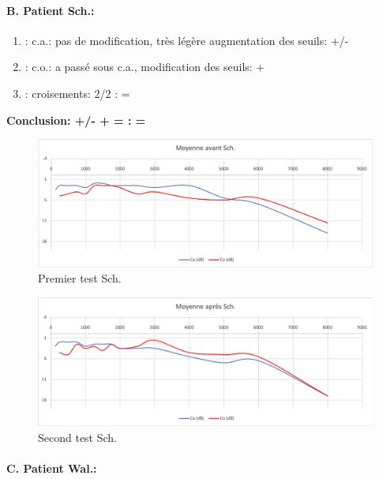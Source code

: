 \paragraph{B. Patient Sch.:}

	\begin{enumerate}
 		
 		\item : c.a.: pas de modification, très légère augmentation des
                  seuils: +/-
 		\item : c.o.: a passé sous c.a., modification des seuils: +
 		\item : croisements: 2/2 :     =
                  
                \end{enumerate}

              \textbf{  Conclusion:  +/-    +    =        :  =}

\begin{figure}
\centering
\includegraphics[width=0.7\linewidth]{images/graphiques/schaff_pre.png}
\caption[Moyenne OG+OD]{Premier test Sch.}
       
\label{groupecontroleimage1}
\end{figure}


         \begin{figure}
\centering
\includegraphics[width=0.7\linewidth]{images/graphiques/schaff_post.png}
\caption[Moyenne OG+OD]{Second test Sch.}
       
\label{groupecontroleimage1}
\end{figure}


\paragraph{C. Patient Wal.:}



